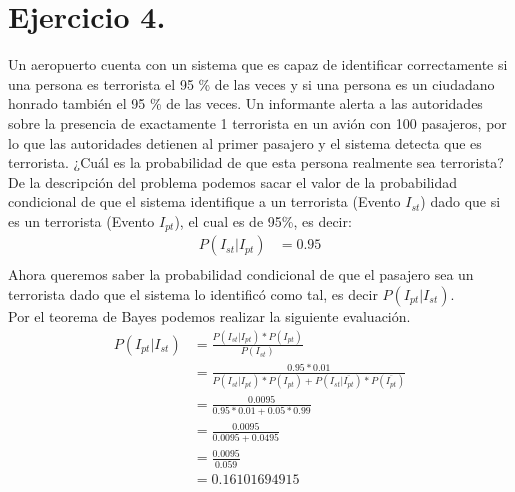 \documentclass[12pt]{article}
\begin{document}
\section{Ejercicio 4.}
Un aeropuerto cuenta con un sistema que es capaz de identificar correctamente si una persona
es terrorista el 95 \% de las veces y si una persona es un ciudadano honrado también el 95 \% de
las veces. Un informante alerta a las autoridades sobre la presencia de exactamente 1 terrorista
en un avión con 100 pasajeros, por lo que las autoridades detienen al primer pasajero y el
sistema detecta que es terrorista. ¿Cuál es la probabilidad de que esta persona realmente sea
terrorista?\\
De la descripción del problema podemos sacar el valor de la probabilidad condicional de que el sistema identifique a un terrorista (Evento $I_{st}$) dado que si es un terrorista (Evento $I_{pt}$), el cual es de 95\%, es decir:
\begin{equation}
\begin{split}
P(I_{st} | I_{pt}) &=0.95\\ 
\end{split}
\end{equation}
Ahora queremos saber la probabilidad condicional de que el pasajero sea un terrorista dado que el sistema lo identificó como tal, es decir $P(I_{pt} | I_{st})$.\\
Por el teorema de Bayes podemos realizar la siguiente evaluación.
\begin{equation}
\begin{split}
P(I_{pt} | I_{st}) &=\frac{P(I_{st} | I_{pt}) * P(I_{pt})}{P(I_{st})}\\
&=\frac{0.95 * 0.01}{P(I_{st} | I_{pt}) * P(I_{pt}) + P(I_{st} | \overline{I_{pt}}) * P(\overline{I_{pt}})}\\ 
&=\frac{0.0095}{0.95 * 0.01 + 0.05 * 0.99}\\
&=\frac{0.0095}{0.0095 + 0.0495}\\
&=\frac{0.0095}{0.059}\\
&=0.16101694915\\
\end{split}
\end{equation}
\end{document}
